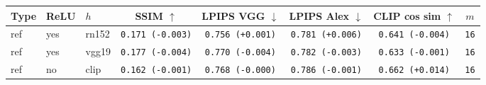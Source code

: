 \begin{tabular}{|l|l|l|c|c|c|c|c|}
\hline
Type & ReLU & $h$ & SSIM $\uparrow$ & LPIPS VGG $\downarrow$ & LPIPS Alex $\downarrow$ & CLIP cos sim $\uparrow$ & $m$ \\
\hline
ref & yes & rn152 & \texttt{0.171 {\color{red}(-0.003)}} & \texttt{0.756 {\color{red}(+0.001)}} & \texttt{0.781 {\color{red}(+0.006)}} & \texttt{0.641 {\color{red}(-0.004)}} & \texttt{16} \\
\hline
ref & yes & vgg19 & \texttt{0.177 {\color{red}(-0.004)}} & \texttt{0.770 {\color{green}(-0.004)}} & \texttt{0.782 {\color{green}(-0.003)}} & \texttt{0.633 {\color{red}(-0.001)}} & \texttt{16} \\
\hline
ref & no & clip & \texttt{0.162 {\color{red}(-0.001)}} & \texttt{0.768 {\color{black}(-0.000)}} & \texttt{0.786 {\color{green}(-0.001)}} & \texttt{0.662 {\color{green}(+0.014)}} & \texttt{16} \\
\hline
\end{tabular}
